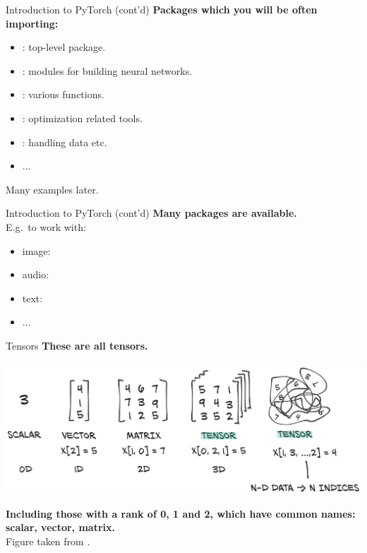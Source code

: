 \begin{frame}{Introduction to PyTorch (cont'd)}
\textbf{Packages which you will be often importing:}\\
\begin{itemize}
\item {}: top-level package.
\item {}: modules for building neural networks. 
\item {}: various functions.
\item {}: optimization related tools. 
\item {}: handling data etc.
\item ...
\end{itemize}
Many examples later.
\end{frame}

\begin{frame}{Introduction to PyTorch (cont'd)}
\textbf{Many packages are available.}\\
\vsp
E.g.~to work with:
\begin{itemize}
\item image: 
\item audio: 
\item text: 
\item ...
\end{itemize}
\vsp
\end{frame}

\begin{frame}{Tensors}
\pause
\textbf{These are all tensors.}
\vspace{5mm}
  \begin{center}
    \includegraphics[height=0.5\textheight]{figures/tensors.png}
  \end{center}
\textbf{Including those with a rank of 0, 1 and 2, which have common names:\\ scalar, vector, matrix.}\\
\vspace{5mm}
\scriptsize{Figure taken from .}\\
\end{frame}

